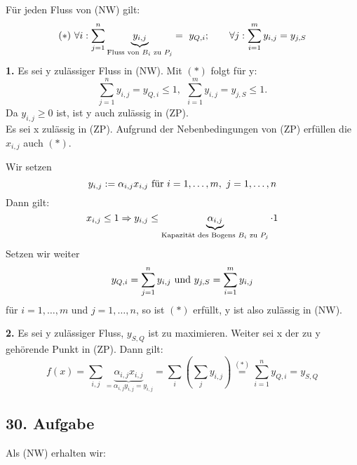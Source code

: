 \documentclass[a4paper,11pt,twoside,titlepage]{article}
\begin{document}
Für jeden Fluss von (NW) gilt:
\[(*)\ \forall i :\sum_{j=1}^n\underbrace{y_{i,j}}_{\textnormal{Fluss von }B_i \textnormal{ zu } P_j} =\ y_{Q,i};\qquad\forall j:\sum_{i=1}^my_{i,j}=y_{j,S} \]
\textbf{1.} Es sei y zulässiger Fluss in (NW). Mit $(*)$ folgt für y:
\[\sum_{j=1}^ny_{i,j}=y_{Q,i}\le1,\ \ \sum_{i=1}^my_{i,j}=y_{j,S}\le 1.\]
Da $y_{i,j}\ge 0$ ist, ist y auch zulässig in (ZP).\\

Es sei x zulässig in (ZP). Aufgrund der Nebenbedingungen von (ZP) erfüllen die $x_{i,j}$ auch $(*)$.

Wir setzen \[y_{i,j}:=\alpha_{i,j}x_{i,j}  \textnormal{ für }i=1,\ldots,m,\ j=1,\ldots,n\]
Dann gilt:
\[x_{i,j}\le1 \Rightarrow y_{i,j}\le \underbrace{\alpha_{i,j}}_{\textnormal{Kapazität des Bogens }B_i\textnormal{ zu } P_j}\cdot1\]
Setzen wir weiter
\[y_{Q,i}=\sum_{j=1}^ny_{i,j} \textnormal{ und } y_{j,S}=\sum_{i=1}^my_{i,j}\]
für $i=1,\ldots,m$ und $j=1,\ldots,n$, so ist $(*)$ erfüllt, y ist also zulässig in (NW).

\textbf{2.} Es sei y zulässiger Fluss, $y_{S,Q}$ ist zu maximieren. Weiter sei x der zu y gehörende Punkt in (ZP). Dann gilt:
\[ f(x)=\sum_{i,j}\underbrace{\alpha_{i,j}x_{i,j}}_{=\alpha_{i,j}y_{i,j}=y_{i,j}}=\sum_i\left(\sum_jy_{i,j}\right) \stackrel{(*)}{=}\sum_{i=1}^ny_{Q,i}=y_{S,Q} \]

\subsection*{30. Aufgabe}

Als (NW) erhalten wir:
\end{document}
